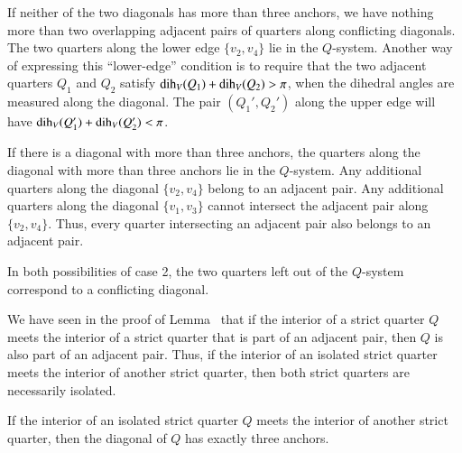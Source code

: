 \begin{tarskidata}
\begin{tarski}
\begin{proved}
If neither of the two diagonals has more than three anchors, we
have nothing more than two overlapping adjacent pairs of quarters
along conflicting diagonals.  The two quarters along the lower
edge $\{v_2,v_4\}$ lie in the $Q$-system.  Another way of
expressing this ``lower-edge'' condition is to require that the
two adjacent quarters $Q_1$ and $Q_2$ satisfy
$\operatorname{dih}_V(Q_1)+\operatorname{dih}_V(Q_2)>\pi$, when the dihedral angles are measured
along the diagonal. The pair $(Q_1',Q_2')$ along the upper edge
will have $\operatorname{dih}_V(Q_1')+\operatorname{dih}_V(Q_2')<\pi$.

If there is a diagonal with more than three anchors,  the quarters
along the diagonal with more than three anchors lie in the
$Q$-system.  Any additional quarters along the diagonal
$\{v_2,v_4\}$ belong to an adjacent pair. Any additional quarters
along the diagonal $\{v_1,v_3\}$ cannot intersect the adjacent
pair along $\{v_2,v_4\}$.  Thus, every quarter intersecting an
adjacent pair also belongs to an adjacent pair.

In both possibilities of case 2, the two quarters left out of the
$Q$-system correspond to a conflicting diagonal.
\swallowed\end{proved}
\end{tarski}



\begin{remark}
We have seen in the proof of Lemma~ that if
the interior of a strict quarter $Q$ meets the interior of a
strict quarter that is part of an adjacent pair, then $Q$ is also
part of an adjacent pair. Thus, if the interior of an isolated
strict quarter meets the interior of another strict quarter, then
both strict quarters are necessarily isolated.
\end{remark}

\begin{tarski}

\begin{lemma}
If the interior of an isolated strict quarter $Q$ meets the
interior of another strict quarter, then the diagonal of $Q$ has
exactly three anchors.
\end{lemma}


\end{tarski}
\end{tarskidata}
